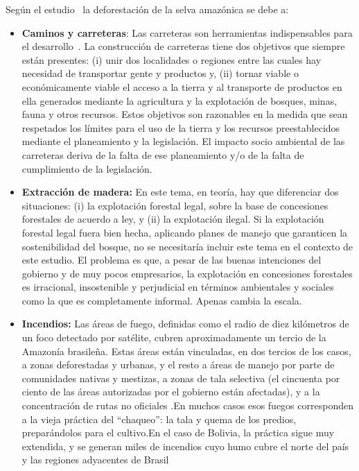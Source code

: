  
Según el estudio~\cite{mena2010respuestas} la deforestación de la selva amazónica se debe a: 
 \begin{itemize}
  \item \textbf{Caminos y carreteras}: Las carreteras son herramientas indispensables para el desarrollo~\cite{dourojeanni2009amazonia}. La construcción de carreteras tiene dos objetivos que siempre están presentes: (i) unir dos localidades o regiones entre las cuales hay necesidad de transportar gente y productos y, (ii) tornar viable o económicamente viable el acceso a la tierra y al transporte de productos en ella generados mediante la agricultura y la explotación de bosques, minas, fauna y otros recursos. Estos objetivos son razonables en la medida que sean respetados los límites para el uso de la tierra y los recursos preestablecidos mediante el planeamiento y la legislación. El impacto socio ambiental de las carreteras deriva de la falta de ese planeamiento y/o de la falta de cumplimiento de la legislación. 
 \item \textbf{Extracción de madera: }En este tema, en teoría, hay que diferenciar dos situaciones: (i) la explotación forestal legal, sobre la base de concesiones forestales de acuerdo a ley, y (ii) la explotación ilegal. Si la explotación forestal legal fuera bien hecha, aplicando planes de manejo que garanticen la sostenibilidad del bosque, no se necesitaría incluir este tema en el contexto de este estudio. El problema es que, a pesar de las buenas intenciones del gobierno y de muy pocos empresarios, la explotación en concesiones forestales es irracional, insostenible y perjudicial en términos ambientales y sociales como la que es completamente informal. Apenas cambia la escala. 
 \item \textbf{Incendios: }Las áreas de fuego, definidas como el radio de diez kilómetros de un foco detectado por satélite, cubren aproximadamente un tercio de la Amazonía brasileña. Estas áreas están vinculadas, en dos tercios de los casos, a zonas deforestadas y urbanas, y el resto a áreas de manejo por parte de comunidades nativas y mestizas, a zonas de tala selectiva (el cincuenta por ciento de las áreas autorizadas por el gobierno están afectadas), y a la concentración de rutas no oficiales\cite{barreto2006human} .En muchos casos esos fuegos corresponden a la vieja práctica del ``chaqueo'': la tala y quema de los predios, preparándolos para el cultivo.En el caso de Bolivia, la práctica sigue muy extendida, y se generan miles de incendios cuyo humo cubre el norte del país y las regiones adyacentes de Brasil

\end{itemize}
